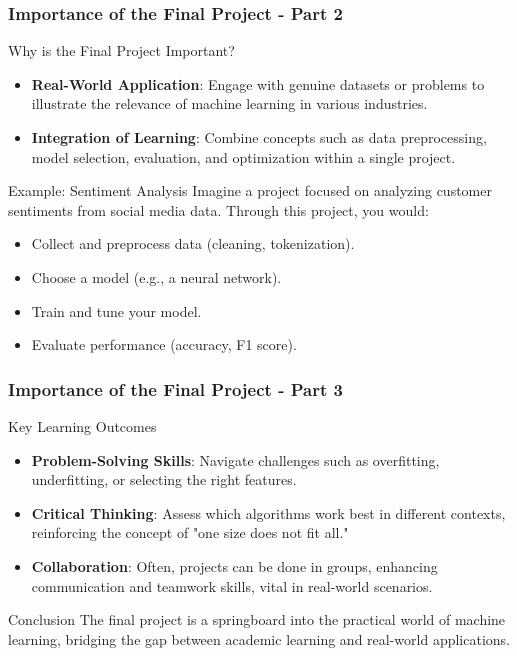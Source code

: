 \documentclass[aspectratio=169]{beamer}
\begin{document}
\begin{frame}[fragile]
    \frametitle{Importance of the Final Project - Part 2}
    \begin{block}{Why is the Final Project Important?}
        \begin{itemize}
            \item \textbf{Real-World Application}: Engage with genuine datasets or problems to illustrate the relevance of machine learning in various industries.
            \item \textbf{Integration of Learning}: Combine concepts such as data preprocessing, model selection, evaluation, and optimization within a single project.
        \end{itemize}
    \end{block}
    \begin{block}{Example: Sentiment Analysis}
        Imagine a project focused on analyzing customer sentiments from social media data. Through this project, you would:
        \begin{itemize}
            \item Collect and preprocess data (cleaning, tokenization).
            \item Choose a model (e.g., a neural network).
            \item Train and tune your model.
            \item Evaluate performance (accuracy, F1 score).
        \end{itemize}
    \end{block}
\end{frame}

\begin{frame}[fragile]
    \frametitle{Importance of the Final Project - Part 3}
    \begin{block}{Key Learning Outcomes}
        \begin{itemize}
            \item \textbf{Problem-Solving Skills}: Navigate challenges such as overfitting, underfitting, or selecting the right features.
            \item \textbf{Critical Thinking}: Assess which algorithms work best in different contexts, reinforcing the concept of "one size does not fit all."
            \item \textbf{Collaboration}: Often, projects can be done in groups, enhancing communication and teamwork skills, vital in real-world scenarios.
        \end{itemize}
    \end{block}
    \begin{block}{Conclusion}
        The final project is a springboard into the practical world of machine learning, bridging the gap between academic learning and real-world applications.
    \end{block}
\end{frame}
\end{document}
